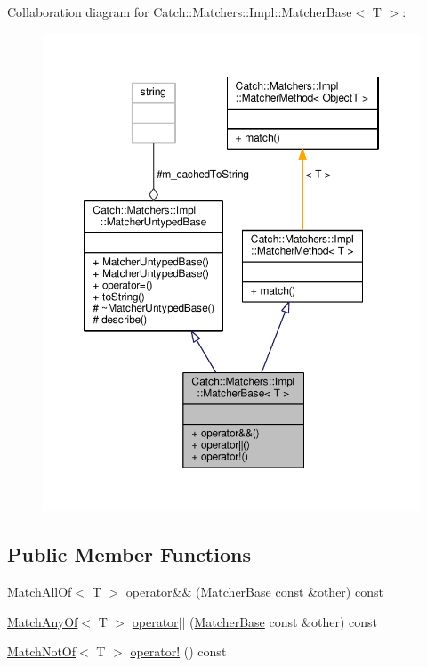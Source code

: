 Collaboration diagram for Catch\-:\-:Matchers\-:\-:Impl\-:\-:Matcher\-Base$<$ T $>$\-:
\nopagebreak
\begin{figure}[H]
\begin{center}
\leavevmode
\includegraphics[width=350pt]{struct_catch_1_1_matchers_1_1_impl_1_1_matcher_base__coll__graph}
\end{center}
\end{figure}
\subsection*{Public Member Functions}
\begin{DoxyCompactItemize}
\item 
\hyperlink{struct_catch_1_1_matchers_1_1_impl_1_1_match_all_of}{Match\-All\-Of}$<$ T $>$ \hyperlink{struct_catch_1_1_matchers_1_1_impl_1_1_matcher_base_a275a18e3e1c4d0bddfde34e362f66b6c}{operator\&\&} (\hyperlink{struct_catch_1_1_matchers_1_1_impl_1_1_matcher_base}{Matcher\-Base} const \&other) const 
\item 
\hyperlink{struct_catch_1_1_matchers_1_1_impl_1_1_match_any_of}{Match\-Any\-Of}$<$ T $>$ \hyperlink{struct_catch_1_1_matchers_1_1_impl_1_1_matcher_base_a382ffd0d07d6a5cdadd2bd36ade0a742}{operator$\vert$$\vert$} (\hyperlink{struct_catch_1_1_matchers_1_1_impl_1_1_matcher_base}{Matcher\-Base} const \&other) const 
\item 
\hyperlink{struct_catch_1_1_matchers_1_1_impl_1_1_match_not_of}{Match\-Not\-Of}$<$ T $>$ \hyperlink{struct_catch_1_1_matchers_1_1_impl_1_1_matcher_base_afd5c25339eab93d9ea037fa4282fca7c}{operator!} () const 
\end{DoxyCompactItemize}
